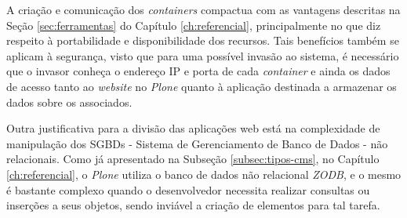 A criação e comunicação dos \textit{containers} compactua com as vantagens descritas na Seção \ref{sec:ferramentas} do Capítulo \ref{ch:referencial}, principalmente no que diz respeito à portabilidade e disponibilidade dos recursos. Tais benefícios também se aplicam à segurança, visto que para uma possível invasão ao sistema, é necessário que o invasor conheça o endereço IP e porta de cada \textit{container} e ainda os dados de acesso tanto ao \textit{website} no \textit{Plone} quanto à aplicação destinada a armazenar os dados sobre os associados.   

Outra justificativa para a divisão das aplicações web está na complexidade de manipulação dos SGBDs - Sistema de Gerenciamento de Banco de Dados - não relacionais. Como já apresentado na Subseção \ref{subsec:tipos-cms}, no Capítulo \ref{ch:referencial}, o \textit{Plone} utiliza o banco de dados não relacional \textit{ZODB}, e o mesmo é bastante complexo quando o desenvolvedor necessita realizar consultas ou inserções a seus objetos, sendo inviável a criação de elementos para tal tarefa.  


